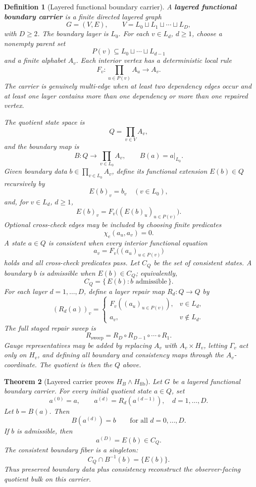 \documentclass[11pt]{article}
\newtheorem{theorem}{Theorem}[section]
\newtheorem{definition}[theorem]{Definition}
\theoremstyle{remark}
\theoremstyle{plain}
\begin{document}
\begin{definition}[Layered functional boundary carrier]\label{def:layered-functional-boundary-carrier}
A \textbf{layered functional boundary carrier} is a finite directed layered graph
\[
G=(V,E),\qquad V=L_0\sqcup L_1\sqcup\cdots\sqcup L_D,
\]
with \(D\ge2\).  The boundary layer is \(L_0\).  For each \(v\in L_d\), \(d\ge1\), choose a
nonempty parent set
\[
P(v)\subseteq L_0\sqcup\cdots\sqcup L_{d-1}
\]
and a finite alphabet \(A_v\).  Each interior vertex has a deterministic local rule
\[
F_v:\prod_{u\in P(v)}A_u\to A_v.
\]
The carrier is genuinely multi-edge when at least two dependency edges occur and at least one layer
contains more than one dependency or more than one repaired vertex.

The quotient state space is
\[
Q=\prod_{v\in V}A_v,
\]
and the boundary map is
\[
B:Q\to\prod_{v\in L_0}A_v,\qquad B(a)=a|_{L_0}.
\]
Given boundary data \(b\in\prod_{v\in L_0}A_v\), define its functional extension \(E(b)\in Q\)
recursively by
\[
E(b)_v=b_v\quad(v\in L_0),
\]
and, for \(v\in L_d\), \(d\ge1\),
\[
E(b)_v=F_v\bigl((E(b)_u)_{u\in P(v)}\bigr).
\]
Optional cross-check edges may be included by choosing finite predicates
\[
\chi_e(a_u,a_v)=0.
\]
A state \(a\in Q\) is consistent when every interior functional equation
\[
a_v=F_v\bigl((a_u)_{u\in P(v)}\bigr)
\]
holds and all cross-check predicates pass.  Let \(C_Q\) be the set of consistent states.  A
boundary \(b\) is admissible when \(E(b)\in C_Q\); equivalently,
\[
C_Q=\{\,E(b):b\text{ admissible}\,\}.
\]
For each layer \(d=1,\ldots,D\), define a layer repair map \(R_d:Q\to Q\) by
\[
(R_d(a))_v=
\begin{cases}
F_v((a_u)_{u\in P(v)}),& v\in L_d,\\
a_v,& v\notin L_d.
\end{cases}
\]
The full staged repair sweep is
\[
R_{\mathrm{sweep}}=R_D\circ R_{D-1}\circ\cdots\circ R_1.
\]
Gauge representatives may be added by replacing \(A_v\) with \(A_v\times H_v\), letting
\(\Gamma_v\) act only on \(H_v\), and defining all boundary and consistency maps through the
\(A_v\)-coordinate.  The quotient is then the \(Q\) above.
\end{definition}

\begin{theorem}[Layered carrier proves \(H_B\wedge H_{\mathrm{fib}}\)]\label{thm:layered-carrier-HB-Hfib}
Let \(G\) be a layered functional boundary carrier.  For every initial quotient state \(a\in Q\),
set
\[
a^{(0)}=a,\qquad a^{(d)}=R_d(a^{(d-1)}),\quad d=1,\ldots,D.
\]
Let \(b=B(a)\).  Then
\[
B(a^{(d)})=b
\qquad
\text{for all }d=0,\ldots,D.
\]
If \(b\) is admissible, then
\[
a^{(D)}=E(b)\in C_Q.
\]
The consistent boundary fiber is a singleton:
\[
C_Q\cap B^{-1}(b)=\{E(b)\}.
\]
Thus preserved boundary data plus consistency reconstruct the observer-facing quotient bulk on this
carrier.
\end{theorem}
\end{document}
